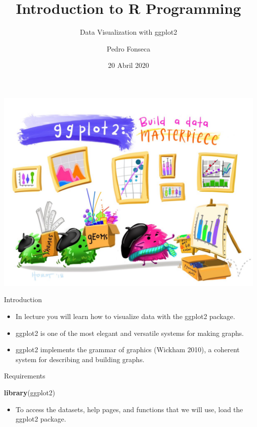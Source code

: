 \documentclass[ignorenonframetext,]{beamer}
\title{Introduction to R Programming}
\subtitle{Data Visualization with ggplot2}
\author{Pedro Fonseca}
\date{20 Abril 2020}
\newenvironment{Shaded}{\begin{snugshade}}{\end{snugshade}}
\newcommand{\KeywordTok}[1]{\textcolor[rgb]{0.13,0.29,0.53}{\textbf{#1}}}
\newcommand{\NormalTok}[1]{#1}
\providecommand{\tightlist}{%
  \setlength{\itemsep}{0pt}\setlength{\parskip}{0pt}}
\begin{document}
\frame{\titlepage}

\begin{frame}

\includegraphics{figures/pic.png}

\end{frame}

\begin{frame}{Introduction}
\protect\hypertarget{introduction}{}

\begin{itemize}
\item
  In lecture you will learn how to visualize data with the ggplot2
  package.
\item
  ggplot2 is one of the most elegant and versatile systems for making
  graphs.
\item
  ggplot2 implements the grammar of graphics (Wickham 2010), a coherent
  system for describing and building graphs.
\end{itemize}

\end{frame}

\begin{frame}[fragile]{Requirements}
\protect\hypertarget{requirements}{}

\begin{Shaded}
\begin{Highlighting}[]
\KeywordTok{library}\NormalTok{(ggplot2)}
\end{Highlighting}
\end{Shaded}

\begin{itemize}
\tightlist
\item
  To access the datasets, help pages, and functions that we will use,
  load the ggplot2 package.
\end{itemize}

\end{frame}
\end{document}
